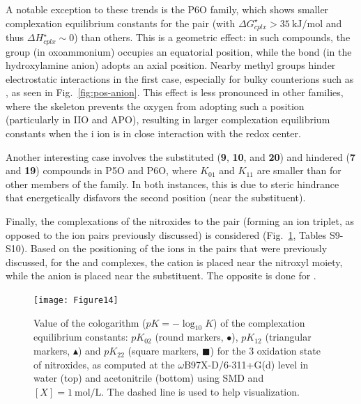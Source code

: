 \documentclass[review,preprint]{elsarticle}
\begin{document}
A notable exception to these trends is the P6O family, which shows smaller complexation equilibrium constants for the  pair (with $\Delta G^\star_{cplx} > \SI{35}{\kilo\joule\per\mole}$ and thus $\Delta H^\star_{cplx} \sim 0$) than others. This is a geometric effect: in such compounds, the  group (in oxoammonium) occupies an equatorial position, while the  bond (in the hydroxylamine anion) adopts an axial position. Nearby methyl groups hinder electrostatic interactions in the first case, especially for bulky counterions such as , as seen in Fig.~\ref{fig:pos-anion}. This effect is less pronounced in other families, where the skeleton prevents the oxygen from adopting such a position (particularly in IIO and APO), resulting in larger complexation equilibrium constants when the i ion is in close interaction with the redox center.

Another interesting case involves the substituted (\textbf{9}, \textbf{10}, and \textbf{20}) and hindered (\textbf{7} and \textbf{19}) compounds in P5O and P6O, where $K_{01}$ and $K_{11}$ are smaller than for other members of the family. In both instances, this is due to steric hindrance that energetically disfavors the second position (near the substituent).

Finally, the complexations of the nitroxides to the  pair (forming an ion triplet, as opposed to the ion pairs previously discussed) is considered (Fig.~\ref{fig:Kx2}, Tables S9-S10). Based on the positioning of the ions in the pairs that were previously discussed, for the  and  complexes, the cation is placed near the nitroxyl moiety, while the anion is placed near the substituent. The opposite is done for . 


\begin{figure}[!h]
	\centering
	\texttt{[image: Figure14]}
	\caption{Value of the cologarithm ($pK = -\log_{10}K$) of the complexation equilibrium constants: $pK_{02}$ (round markers, $\bullet$), $pK_{12}$ (triangular markers, $\blacktriangle$) and $pK_{22}$ (square markers, $\blacksquare$) for the 3 oxidation state of nitroxides, as computed at the $\omega$B97X-D/6-311+G(d) level in water (top) and acetonitrile (bottom) using SMD and $[X]=\SI{1}{\mole\per\liter}$.  The dashed line is used to help visualization. }
	\label{fig:Kx2}
\end{figure}
\end{document}
